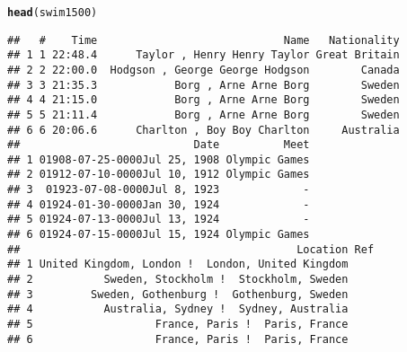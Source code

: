 \documentclass[12pt]{beamer}\usepackage[]{graphicx}\usepackage[]{color}
\makeatletter
\newcommand{\hlstd}[1]{\textcolor[rgb]{0.345,0.345,0.345}{#1}}%
\newcommand{\hlkwd}[1]{\textcolor[rgb]{0.737,0.353,0.396}{\textbf{#1}}}%
\newenvironment{kframe}{%
 \def\at@end@of@kframe{}%
 \ifinner\ifhmode%
  \def\at@end@of@kframe{\end{minipage}}%
  \begin{minipage}{\columnwidth}%
 \fi\fi%
 \def\FrameCommand##1{\hskip\@totalleftmargin \hskip-\fboxsep
 \colorbox{shadecolor}{##1}\hskip-\fboxsep
     \hskip-\linewidth \hskip-\@totalleftmargin \hskip\columnwidth}%
 \MakeFramed {\advance\hsize-\width
   \@totalleftmargin\z@ \linewidth\hsize
   \@setminipage}}%
 {\par\unskip\endMakeFramed%
 \at@end@of@kframe}
\newenvironment{knitrout}{}{} %
\makeatother
\begin{document}

\begin{frame}[fragile]
\frametitle{}

\begin{knitrout}\scriptsize
{}\color{fgcolor}\begin{kframe}
\begin{alltt}
\hlkwd{head}\hlstd{(swim1500)}
\end{alltt}
\begin{verbatim}
##   #    Time                             Name   Nationality
## 1 1 22:48.4      Taylor , Henry Henry Taylor Great Britain
## 2 2 22:00.0  Hodgson , George George Hodgson        Canada
## 3 3 21:35.3            Borg , Arne Arne Borg        Sweden
## 4 4 21:15.0            Borg , Arne Arne Borg        Sweden
## 5 5 21:11.4            Borg , Arne Arne Borg        Sweden
## 6 6 20:06.6      Charlton , Boy Boy Charlton     Australia
##                           Date          Meet
## 1 01908-07-25-0000Jul 25, 1908 Olympic Games
## 2 01912-07-10-0000Jul 10, 1912 Olympic Games
## 3  01923-07-08-0000Jul 8, 1923             -
## 4 01924-01-30-0000Jan 30, 1924             -
## 5 01924-07-13-0000Jul 13, 1924             -
## 6 01924-07-15-0000Jul 15, 1924 Olympic Games
##                                           Location Ref
## 1 United Kingdom, London !  London, United Kingdom    
## 2           Sweden, Stockholm !  Stockholm, Sweden    
## 3         Sweden, Gothenburg !  Gothenburg, Sweden    
## 4           Australia, Sydney !  Sydney, Australia    
## 5                   France, Paris !  Paris, France    
## 6                   France, Paris !  Paris, France
\end{verbatim}
\end{kframe}
\end{knitrout}

\end{frame}

\end{document}
